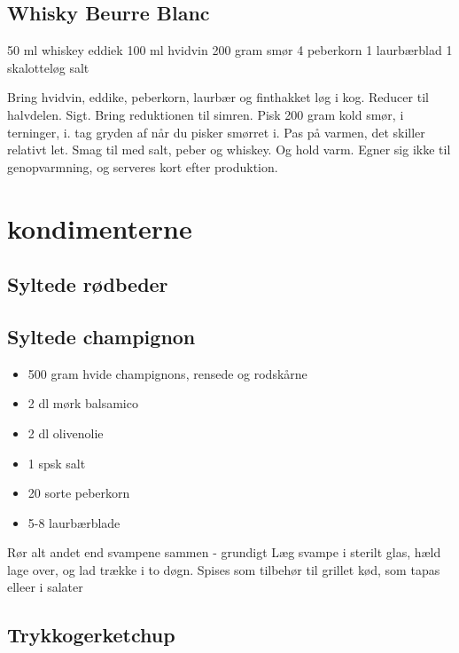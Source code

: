 \documentclass[
  letterpaper,
  DIV=11,
  numbers=noendperiod]{scrreprt}
\providecommand{\tightlist}{%
  \setlength{\itemsep}{0pt}\setlength{\parskip}{0pt}}\usepackage{longtable,booktabs,array}
\begin{document}
\hypertarget{whisky-beurre-blanc}{%
\section{Whisky Beurre Blanc}\label{whisky-beurre-blanc}}

50 ml whiskey eddiek 100 ml hvidvin 200 gram smør 4 peberkorn 1
laurbærblad 1 skalotteløg salt

Bring hvidvin, eddike, peberkorn, laurbær og finthakket løg i kog.
Reducer til halvdelen. Sigt. Bring reduktionen til simren. Pisk 200 gram
kold smør, i terninger, i. tag gryden af når du pisker smørret i. Pas på
varmen, det skiller relativt let. Smag til med salt, peber og whiskey.
Og hold varm. Egner sig ikke til genopvarmning, og serveres kort efter
produktion.


\hypertarget{kondimenterne}{%
\chapter{kondimenterne}\label{kondimenterne}}

\hypertarget{syltede-ruxf8dbeder}{%
\section{Syltede rødbeder}\label{syltede-ruxf8dbeder}}

\hypertarget{syltede-champignon}{%
\section{Syltede champignon}\label{syltede-champignon}}

\begin{itemize}
\tightlist
\item
  500 gram hvide champignons, rensede og rodskårne
\item
  2 dl mørk balsamico
\item
  2 dl olivenolie
\item
  1 spsk salt
\item
  20 sorte peberkorn
\item
  5-8 laurbærblade
\end{itemize}

Rør alt andet end svampene sammen - grundigt Læg svampe i sterilt glas,
hæld lage over, og lad trække i to døgn. Spises som tilbehør til grillet
kød, som tapas elleer i salater

\hypertarget{trykkogerketchup}{%
\section{Trykkogerketchup}\label{trykkogerketchup}}
\end{document}
